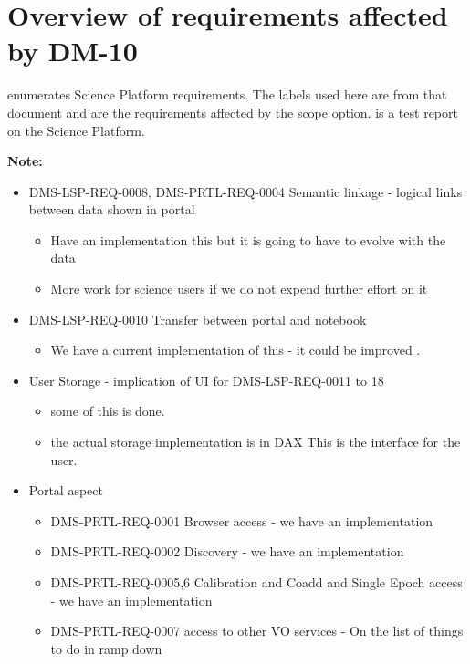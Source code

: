 \section { Overview of requirements affected by DM-10}\label{sect:reqs}
 enumerates  Science Platform requirements.
The labels used here are from that document and are the requirements affected by the scope option.
 is a test report on the Science Platform.

\textbf{Note:} 
\begin{itemize}
\item DMS-LSP-REQ-0008, DMS-PRTL-REQ-0004 Semantic linkage - logical links between data shown in portal
\begin{itemize}
\item Have an implementation this but it is going to have to evolve with the data 
\item More work for science users if we do not expend further effort on it
\end{itemize}

\item DMS-LSP-REQ-0010 Transfer between portal and notebook
\begin{itemize}
\item We have a current implementation of this - it could be improved .
\end{itemize}
\item User Storage - implication of UI for DMS-LSP-REQ-0011 to 18
\begin{itemize}
\item some of this is done.
\item the actual storage implementation is in DAX This is the interface for the user.
\end{itemize}
\item Portal aspect
\begin{itemize}
\item DMS-PRTL-REQ-0001 Browser access  - we have an implementation
\item DMS-PRTL-REQ-0002 Discovery  - we have an implementation
\item DMS-PRTL-REQ-0005,6 Calibration and Coadd and Single Epoch access  - we have an implementation
\item DMS-PRTL-REQ-0007 access to other VO services - On the list of things to do in ramp down
\end{itemize}


\end{itemize}
